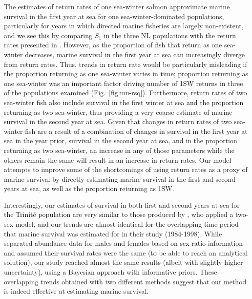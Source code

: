 \documentclass[12pt]{article}
\providecommand{\DIFaddtex}[1]{{\protect\color{blue}\uwave{#1}}} %
\providecommand{\DIFdeltex}[1]{{\protect\color{red}\sout{#1}}}                      %
\providecommand{\DIFaddbegin}{} %
\providecommand{\DIFaddend}{} %
\providecommand{\DIFdelbegin}{} %
\providecommand{\DIFdelend}{} %
\providecommand{\DIFadd}[1]{\texorpdfstring{\DIFaddtex{#1}}{#1}} %
\providecommand{\DIFdel}[1]{\texorpdfstring{\DIFdeltex{#1}}{}} %
\begin{document}
The estimates of return rates of one sea-winter salmon
approximate marine survival in the first year at sea for one
sea-winter-dominated populations, particularly for years in which
directed marine fisheries are largely non-existent,
and we see this by comparing $S_1$ in the three NL populations
with the return rates presented in \citet{ICES2019}. However, as the proportion of fish that
return as one sea-winter decreases, marine survival in the first year at sea
can increasingly diverge from return rates. Thus, trends in return rate
would be particularly misleading if the proportion returning as one sea-winter
varies in time;
proportion returning as one sea-winter was an important factor driving number of
1SW returns in three of the populations examined (Fig.~\ref{fig:mu-rsq}).
Furthermore, return rates of two sea-winter fish also include survival in the
first winter at sea and the proportion returning as two sea-winter, thus
providing a very coarse estimate of marine survival in the second year at sea.
Given that changes in return rates of two sea-winter fish are a result of a
combination of changes in survival in the first year at sea in the year prior,
survival in the second year at sea, and in the proportion returning as two
sea-winter, an increase in any of those parameters while the others remain
the same will result in an increase in return rates. Our model attempts to
improve some of the shortcomings of using return rates as a proxy of marine
survival by directly estimating marine survival in the first and second years
at sea, as well as the proportion returning as 1SW.

Interestingly, our estimates of survival in both first and second years at sea
for the Trinit\'{e} population are very similar to those produced by
\citet{Chaput2003b}, who applied a two-sex model, and our trends are almost identical
for the overlapping time period that marine survival was estimated for in
their study (1984-1998). While \citet{Chaput2003b} separated abundance data
for males and females based on sex ratio information and assumed their
survival rates were the same (to be able to reach an analytical solution), our
study reached almost the same results (albeit with slightly higher
uncertainty), using a Bayesian approach with informative priors. These overlapping
trends obtained with two different methods suggest that our method is indeed
\DIFdelbegin \DIFdel{effective at }\DIFdelend \DIFaddbegin \DIFadd{a viable alternative approach for }\DIFaddend estimating marine survival.
\end{document}
